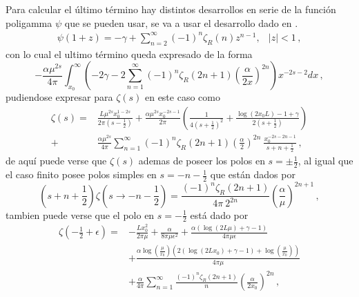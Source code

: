 Para calcular el último término hay distintos desarrollos en serie de la función poligamma $\psi $ que se pueden usar, se va a usar el desarrollo dado en \cite{Abramowitz:1974:HMF:1098650}.
\begin{equation}
\begin{array}{cc}
\psi (1+ z ) = - \gamma + \sum \limits_{n=2}^{\infty} (-1) ^n \zeta _R (n) z ^{n-1},  & |z| < 1
\, ,
\end{array}
\label{repr}
\end{equation}
con lo cual el ultimo término queda expresado de la forma
\begin{equation}
- \frac{\alpha \mu ^{2s}}{4 \pi}
\int _{x_0} ^{\infty}
\left(
-2 \gamma -
2 \sum _{n=1} ^{\infty} 
(-1) ^{n}
\zeta _R (2n+1) 
\left( \frac{\alpha}{2 x} \right) ^{2n}
\right)
x ^{-2s-2} dx
\, ,
\end{equation}
pudiendose expresar para $\zeta  (s) $ en este caso como
\begin{align}
	\zeta (s)=
&
\nonumber
	\frac{L  \mu ^{2s} x _0 ^{1-2s} }{2 \pi \left( s- \frac{1}{2} \right)}  + 
	\frac{\alpha \mu ^{2s} x _{0} ^{-2s-1} }{2 \pi} 
	\left( 
	\frac{1}{4 \left(s+ \frac{1}{2} \right) ^2} +
	\frac{\log(2 x _0 L) -1 + \gamma}{2 \left(s+\frac{1}{2} \right)} 
	\right) 
\\
+
&	
	\frac{\alpha \mu ^{2s}}{4\pi} 
	\sum _{n=1} ^{\infty} (-1) ^{n} \zeta _R (2n+1) 
	\left( \frac{\alpha}{2 } \right) ^{2n} \ \frac{x _0 ^{-2s-2n-1}}{s+n+ \frac{1}{2}}
	\, ,
\end{align}
de aquí puede verse que $ \zeta (s) $ ademas de poseer los polos en $s = \pm \frac{1}{2}$, al igual que el caso finito posee polos simples en $ s = -n - \frac{1}{2}$ que están dados por
\begin{equation}
	\left( s + n + \frac{1}{2}\right)
	\zeta \left( s \rightarrow -n - \frac{1}{2}\right) =
	\frac{(-1) ^n \zeta _R (2n+1)}{4 \pi \ 2 ^{ 2n } }
	\left( \frac{\alpha}{\mu} \right) ^{2n+1}
	\, ,
\end{equation}
tambien puede verse que el polo en $s = - \frac{1}{2}$ está dado por 
\begin{align}
	\zeta \left(- \frac{1}{2} + \epsilon \right)=
&
\nonumber
	-
	\frac{L x _0 ^2}{2 \pi \mu}+ 
	\frac{\alpha}{8 \pi \mu  \epsilon  ^2} +
	\frac{\alpha \left( \log (2 L \mu ) + \gamma -1  \right)}{4 \pi \mu  \epsilon }
\\
\nonumber
&
+
	\frac{\alpha \log \left( \frac{\mu}{x _0} \right) 	
		\left( 2 (\log ( 2 L x_0) + \gamma -1 ) + \log \left( \frac{\mu}{x _0}\right)  \right) }{4 \pi \mu}
\\
&
+	
	\frac{\alpha }{4\pi} 
	\sum _{n=1} ^{\infty} \frac{(-1) ^{n} \zeta _R (2n+1) }{n}  
	\left( \frac{\alpha}{2 x _0} \right) ^{2n}
\, ,
\end{align}
